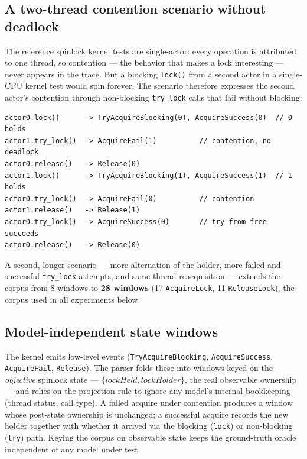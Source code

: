 \documentclass[11pt]{article}
\begin{document}
\subsection{A two-thread contention scenario without deadlock}

The reference spinlock kernel tests are single-actor: every operation is
attributed to one thread, so contention --- the behavior that makes a lock
interesting --- never appears in the trace. But a blocking \texttt{lock()}
from a second actor in a single-CPU kernel test would spin forever. The
scenario therefore expresses the second actor's contention through
non-blocking \texttt{try\_lock} calls that fail without blocking:

\begin{lstlisting}[style=code]
actor0.lock()      -> TryAcquireBlocking(0), AcquireSuccess(0)  // 0 holds
actor1.try_lock()  -> AcquireFail(1)          // contention, no deadlock
actor0.release()   -> Release(0)
actor1.lock()      -> TryAcquireBlocking(1), AcquireSuccess(1)  // 1 holds
actor0.try_lock()  -> AcquireFail(0)          // contention
actor1.release()   -> Release(1)
actor0.try_lock()  -> AcquireSuccess(0)       // try from free succeeds
actor0.release()   -> Release(0)
\end{lstlisting}

A second, longer scenario --- more alternation of the holder, more failed and
successful \texttt{try\_lock} attempts, and same-thread reacquisition ---
extends the corpus from 8 windows to \textbf{28 windows} (17
\texttt{AcquireLock}, 11 \texttt{ReleaseLock}), the corpus used in all
experiments below.

\subsection{Model-independent state windows}

The kernel emits low-level events (\texttt{TryAcquireBlocking},
\texttt{AcquireSuccess}, \texttt{AcquireFail}, \texttt{Release}). The parser
folds these into windows keyed on the \emph{objective} spinlock state ---
$\{\mathit{lockHeld}, \mathit{lockHolder}\}$, the real observable ownership
--- and relies on the projection rule to ignore any model's internal
bookkeeping (thread status, call type). A failed acquire under contention
produces a window whose post-state ownership is unchanged; a successful
acquire records the new holder together with whether it arrived via the
blocking (\texttt{lock}) or non-blocking (\texttt{try}) path. Keying the
corpus on observable state keeps the ground-truth oracle independent of any
model under test.
\end{document}
